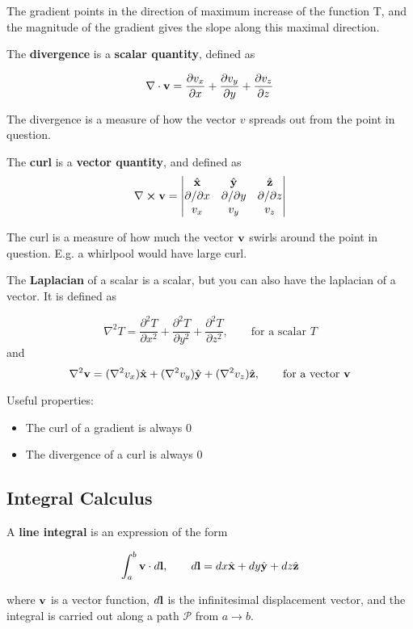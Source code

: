 \documentclass{article}
\newcommand{\vh}[1]{\hat{\vb{#1}}}
\begin{document}
The gradient points in the direction of maximum increase of the function T, and the magnitude of the gradient gives the slope along this maximal direction.

The \textbf{divergence} is a \textbf{scalar quantity}, defined as

$$
\nabla \cdot \vb{v} = \frac{\partial v_x}{\partial x} + \frac{\partial v_y}{\partial y} + \frac{\partial v_z}{\partial z}
$$

The divergence is a measure of how the vector $v$ spreads out from the point in question.

The \textbf{curl} is a \textbf{vector quantity}, and defined as 
$$
\nabla \cross \vb{v}  = \left| \begin{matrix} 
    \vh{x} & \vh{y} & \vh{z} \\
    \partial / \partial x & \partial / \partial y & \partial / \partial z \\
    v_x & v_y & v_z 
  \end{matrix} \right|
$$

The curl is a measure of how much the vector $\vb{v}$ swirls around the point in question. E.g. a whirlpool would have large curl.

The \textbf{Laplacian} of a scalar is a scalar, but you can also have the laplacian of a vector.  It is defined as 

$$
\nabla^2 T = \frac{\partial^2 T}{\partial x^2} + \frac{\partial^2 T}{\partial y^2} + \frac{\partial^2 T}{\partial z^2}, \qquad \text{for a scalar }T
$$
and 
$$
\nabla^2 \vb{v} = (\nabla^2 v_x)\vh{x} + (\nabla^2 v_y) \vh{y} + (\nabla^2 v_z) \vh{z}, \qquad \text{for a vector }\vb{v}
$$

Useful properties:
\begin{itemize}
    \item The curl of a gradient is always 0 
    \item The divergence of a curl is always 0
\end{itemize}


\subsection{Integral Calculus}

A \textbf{line integral} is an expression of the form

$$
\int_{a}^{b} \vb{v} \cdot d\vb{l}, \qquad d\vb{l} = dx \vh{x} + dy \vh{y} + dz \vh{z}
$$

where $\vb{v}$ is a vector function, $d\vb{l}$ is the infinitesimal displacement vector, and the integral is carried out along a path $\mathcal{P}$ from $a \to b$. 
\end{document}
